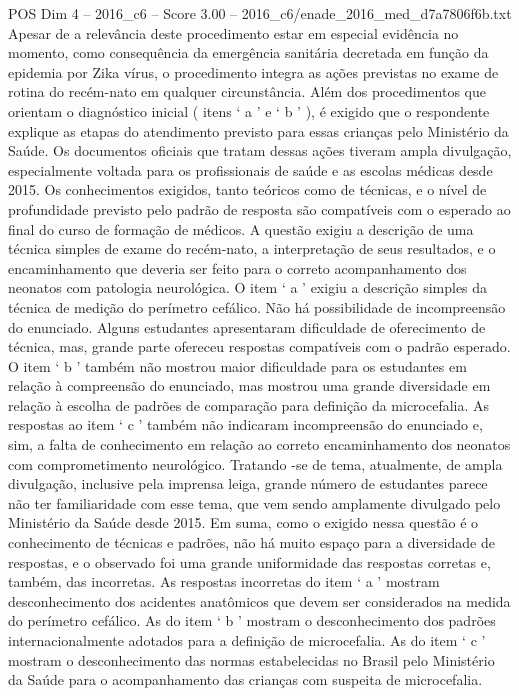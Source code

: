 \begin{textsample}{POS Dim 4 – 2016\_c6 – Score 3.00 – 2016\_c6/enade\_2016\_med\_d7a7806f6b.txt}
Apesar de a relevância deste procedimento estar em especial evidência no momento, como consequência da emergência sanitária decretada em função da epidemia por Zika vírus, o procedimento integra as ações previstas no exame de rotina do recém-nato em qualquer circunstância.
Além dos procedimentos que orientam o diagnóstico inicial ( itens ‘ a ’ e ‘ b ’ ), é exigido que o respondente explique as etapas do atendimento previsto para essas crianças pelo Ministério da Saúde.
Os documentos oficiais que tratam dessas ações tiveram ampla divulgação, especialmente voltada para os profissionais de saúde e as escolas médicas desde 2015.
Os conhecimentos exigidos, tanto teóricos como de técnicas, e o nível de profundidade previsto pelo padrão de resposta são compatíveis com o esperado ao final do curso de formação de médicos.
A questão exigiu a descrição de uma técnica simples de exame do recém-nato, a interpretação de seus resultados, e o encaminhamento que deveria ser feito para o correto acompanhamento dos neonatos com patologia neurológica.
O item ‘ a ’ exigiu a descrição simples da técnica de medição do perímetro cefálico.
Não há possibilidade de incompreensão do enunciado.
Alguns estudantes apresentaram dificuldade de oferecimento de técnica, mas, grande parte ofereceu respostas compatíveis com o padrão esperado.
O item ‘ b ’ também não mostrou maior dificuldade para os estudantes em relação à compreensão do enunciado, mas mostrou uma grande diversidade em relação à escolha de padrões de comparação para definição da microcefalia.
As respostas ao item ‘ c ’ também não indicaram incompreensão do enunciado e, sim, a falta de conhecimento em relação ao correto encaminhamento dos neonatos com comprometimento neurológico.
Tratando -se de tema, atualmente, de ampla divulgação, inclusive pela imprensa leiga, grande número de estudantes parece não ter familiaridade com esse tema, que vem sendo amplamente divulgado pelo Ministério da Saúde desde 2015.
Em suma, como o exigido nessa questão é o conhecimento de técnicas e padrões, não há muito espaço para a diversidade de respostas, e o observado foi uma grande uniformidade das respostas corretas e, também, das incorretas.
As respostas incorretas do item ‘ a ’ mostram desconhecimento dos acidentes anatômicos que devem ser considerados na medida do perímetro cefálico.
As do item ‘ b ’ mostram o desconhecimento dos padrões internacionalmente adotados para a definição de microcefalia.
As do item ‘ c ’ mostram o desconhecimento das normas estabelecidas no Brasil pelo Ministério da Saúde para o acompanhamento das crianças com suspeita de microcefalia.

\end{textsample}
